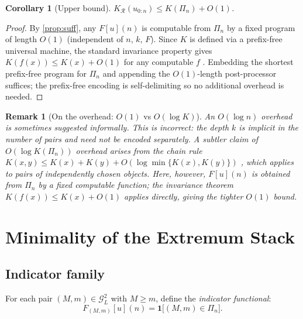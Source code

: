 \documentclass[preprint,12pt]{elsarticle}
\newtheorem{corollary}[theorem]{Corollary}
\newtheorem{remark}[theorem]{Remark}
\newcommand{\R}{\mathcal{R}}
\newcommand{\stack}{\Pi}
\newcommand{\GL}{\mathcal{G}_L}
\begin{document}
\begin{corollary}[Upper bound]
\label{cor:upper}
$K_{\R}(u_{0:n}) \leq K(\stack_n) + O(1)$.
\end{corollary}

\begin{proof}
By \cref{prop:suff}, any $F[u](n)$ is computable from $\stack_n$
by a fixed program of length $O(1)$ (independent of $n$, $k$, $F$).
Since $K$ is defined via a prefix-free universal machine,
the standard invariance property gives $K(f(x)) \leq K(x) + O(1)$
for any computable $f$ \citep{LiVitanyi2008}.
Embedding the shortest prefix-free program for $\stack_n$ and
appending the $O(1)$-length post-processor suffices; the prefix-free
encoding is self-delimiting so no additional overhead is needed.
\end{proof}

\begin{remark}[On the overhead: $O(1)$ vs $O(\log K)$]
\label{rem:correction}
An $O(\log n)$ overhead is sometimes suggested informally.
This is incorrect: the depth $k$ is implicit in the number of pairs
and need not be encoded separately.
A subtler claim of $O(\log K(\stack_n))$ overhead arises from
the chain rule $K(x,y) \leq K(x)+K(y)+O(\log\min\{K(x),K(y)\})$
\citep{LiVitanyi2008}, which applies to pairs of \emph{independently
chosen} objects.
Here, however, $F[u](n)$ is obtained from $\stack_n$ by a
\emph{fixed} computable function; the invariance theorem
$K(f(x)) \leq K(x) + O(1)$ applies directly, giving the tighter
$O(1)$ bound.
\end{remark}

\section{Minimality of the Extremum Stack}
\label{sec:minimality}

\subsection{Indicator family}

For each pair $(M, m) \in \GL^2$ with $M \geq m$, define the
\emph{indicator functional}:
\begin{equation}
  F_{(M,m)}[u](n)
  = \mathbf{1}\bigl[(M, m) \in \stack_n\bigr].
  \label{eq:indicator}
\end{equation}
\end{document}
